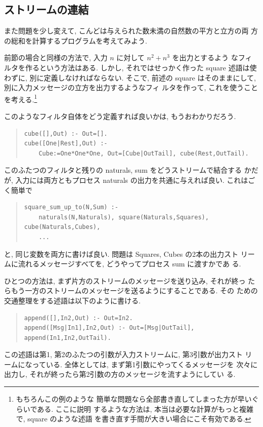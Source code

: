 \documentclass[a4,titlepage]{jsreport}
\newenvironment{program}{\begin{quote}}{\end{quote}}
\begin{document}
\subsection{ストリームの連結}
また問題を少し変えて, こんどは与えられた数未満の自然数の平方と立方の両
方の総和を計算するプログラムを考えてみよう.

前節の場合と同様の方法で, 入力 $n$ に対して $n^2+n^3$ を出力とするよう
なフィルタを作るという方法はある.  しかし, それではせっかく作った 
square 述語は使わずに, 別に定義しなければならない.  そこで, 前述の 
square はそのままにして, 別に入力メッセージの立方を出力するようなフィ
ルタを作って, これを使うことを考える.\footnote{もちろんこの例のような
簡単な問題なら全部書き直してしまった方が早いぐらいである.  ここに説明
するような方法は, 本当は必要な計算がもっと複雑で, square のような述語
を書き直す手間が大きい場合にこそ有効である.}

このようなフィルタ自体をどう定義すれば良いかは, もうおわかりだろう.
\begin{program}
\begin{Verbatim}[baselinestretch=0.8]
cube([],Out) :- Out=[].
cube([One|Rest],Out) :-
    Cube:=One*One*One, Out=[Cube|OutTail], cube(Rest,OutTail).
\end{Verbatim}
\end{program}

このふたつのフィルタと残りの naturals, sum をどうストリームで結合する
かだが, 入力には両方ともプロセス naturals の出力を共通に与えれば良い. 
これはごく簡単で
\begin{program}
\begin{Verbatim}[baselinestretch=0.8]
square_sum_up_to(N,Sum) :-
    naturals(N,Naturals), square(Naturals,Squares), cube(Naturals,Cubes),
    ...
\end{Verbatim}
\end{program}
と, 同じ変数を両方に書けば良い.  問題は Squares, Cubes の2本の出力スト
リームに流れるメッセージすべてを, どうやってプロセス sum に渡すかであ
る.

ひとつの方法は, まず片方のストリームのメッセージを送り込み, それが終っ
たらもう一方のストリームのメッセージを送るようにすることである.  その
ための交通整理をする述語は以下のように書ける.
\begin{program}
\begin{Verbatim}[baselinestretch=0.8]
append([],In2,Out) :- Out=In2.
append([Msg|In1],In2,Out) :- Out=[Msg|OutTail], append(In1,In2,OutTail).
\end{Verbatim}
\end{program}
この述語は第1, 第2のふたつの引数が入力ストリームに, 第3引数が出力スト
リームになっている.  全体としては, まず第1引数にやってくるメッセージを
次々に出力し, それが終ったら第2引数の方のメッセージを流すようにしてい
る.
\end{document}
